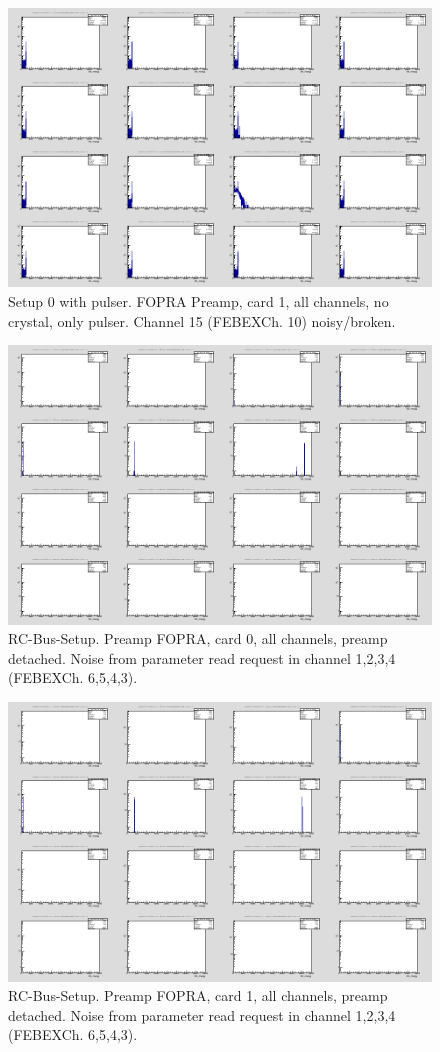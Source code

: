 \documentclass{report}
\begin{document}
\begin{figure}[!htb]
  \includegraphics[width=\linewidth]{fopra_preamp_lim_energy_card1_all.png}
  \caption{Setup 0 with pulser. FOPRA Preamp, card 1, all channels, no crystal, only pulser. Channel 15 (FEBEXCh. 10) noisy/broken.}
\end{figure}
\begin{figure}[!htb]
  \includegraphics[width=\linewidth]{rc_bus_test/preampfopra_card0_gamma_all.png}
  \caption{RC-Bus-Setup. Preamp FOPRA, card 0, all channels, preamp detached. Noise from parameter read request in channel 1,2,3,4 (FEBEXCh. 6,5,4,3).}
\end{figure}
\begin{figure}[!htb]
  \includegraphics[width=\linewidth]{rc_bus_test/preampfopra_card1_gamma_all.png}
  \caption{RC-Bus-Setup. Preamp FOPRA, card 1, all channels, preamp detached. Noise from parameter read request in channel 1,2,3,4 (FEBEXCh. 6,5,4,3).}
\end{figure}
\end{document}

